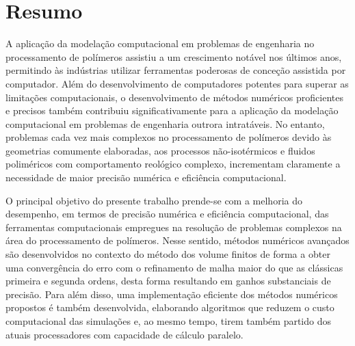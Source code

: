 
\chapter*{Resumo}

A aplica\c c\~ao da modela\c c\~ao computacional em problemas de engenharia no processamento de pol\'imeros assistiu a um crescimento not\'avel nos \'ultimos anos, permitindo \`as ind\'ustrias utilizar ferramentas poderosas de conce\c c\~ao assistida por computador.
Al\'em do desenvolvimento de computadores potentes para superar as limita\c c\~oes computacionais, o desenvolvimento de m\'etodos num\'ericos proficientes e precisos tamb\'em contribuiu significativamente para a aplica\c c\~ao da modela\c c\~ao computacional em problemas de engenharia outrora intrat\'aveis.
No entanto, problemas cada vez mais complexos no processamento de pol\'imeros devido \`as geometrias comumente elaboradas, aos processos n\~ao-isot\'ermicos e fluidos polim\'ericos com comportamento reol\'ogico complexo, incrementam claramente a necessidade de maior precis\~ao num\'erica e efici\^encia computacional.

O principal objetivo do presente trabalho prende-se com a melhoria do desempenho, em termos de precis\~ao num\'erica e efici\^encia computacional, das ferramentas computacionais empregues na resolu\c c\~ao de problemas complexos na \'area do processamento de pol\'imeros.
Nesse sentido, m\'etodos num\'ericos avan\c cados s\~ao desenvolvidos no contexto do m\'etodo dos volume finitos de forma a obter uma converg\^encia do erro com o refinamento de malha maior do que as cl\'assicas primeira e segunda ordens, desta forma resultando em ganhos substanciais de precis\~ao.
Para al\'em disso, uma implementa\c c\~ao eficiente dos m\'etodos num\'ericos propostos \'e tamb\'em desenvolvida, elaborando algoritmos que reduzem o custo computacional das simula\c c\~oes e, ao mesmo tempo, tirem tamb\'em partido dos atuais processadores com capacidade de c\'alculo paralelo.

